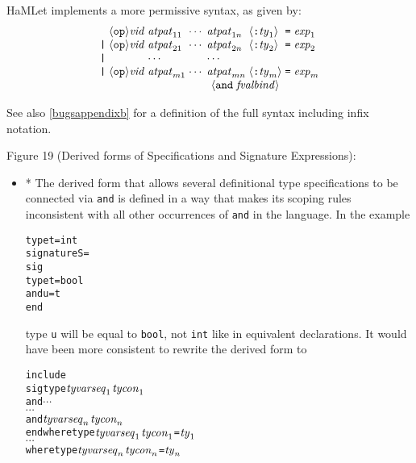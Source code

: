 \documentclass[twoside,titlepage]{article}
\begin{document}
\begin{appendix}
\begin{itemize}
HaMLet implements a more permissive syntax, as given by:
%
\begin{displaymath}
\begin{array}{l@{\;}l@{\;}l@{\;}l@{\;}l@{\;}l@{\;}l@{\;}l}
& \langle{\tt{op}}\rangle\mathit{vid} & \mathit{atpat}_{11} & \cdots & \mathit{atpat}_{1n} & \langle\mbox{\tt:}\mathit{ty}_1\rangle &\mbox{\tt=}& \mathit{exp}_1 \\
\mbox{\tt|} & \langle{\tt{op}}\rangle\mathit{vid} & \mathit{atpat}_{21} & \cdots & \mathit{atpat}_{2n} & \langle\mbox{\tt:}\mathit{ty}_2\rangle &\mbox{\tt=}& \mathit{exp}_2 \\
\mbox{\tt|} & & \cdots & & \cdots \\
\mbox{\tt|} & \langle{\tt{op}}\rangle\mathit{vid} & \mathit{atpat}_{m1} & \cdots & \mathit{atpat}_{mn} & \langle\mbox{\tt:}\mathit{ty}_m\rangle &\mbox{\tt=}& \mathit{exp}_m \\
\multicolumn{6}{r}{\langle {\tt and} \; \mathit{fvalbind} \rangle}
\end{array}
\end{displaymath}

See also \ref{bugsappendixb} for a definition of the full syntax including infix notation.
\end{itemize}


Figure 19 (Derived forms of Specifications and Signature Expressions):

\begin{itemize}
\item * The derived form that allows several definitional type specifications to be connected via {\tt and} is defined in a way that makes its scoping rules inconsistent with all other occurrences of {\tt and} in the language. In the example

\begin{quoting}
\begin{alltt}
type t = int
signature S =
sig
  type t = bool
  and  u = t
end
\end{alltt}
\end{quoting}

type {\tt u} will be equal to {\tt bool}, not {\tt int} like in equivalent declarations. It would have been more consistent to rewrite the derived form to

\begin{quoting}
\begin{alltt}
include
  sig type \(\mathit{tyvarseq}\sb{1}\) \(\mathit{tycon}\sb{1}\)
       and \(\cdots\)
       \(\cdots\)
       and \(\mathit{tyvarseq}\sb{n}\) \(\mathit{tycon}\sb{n}\)
  end where type \(\mathit{tyvarseq}\sb{1}\) \(\mathit{tycon}\sb{1}\) = \(\mathit{ty}\sb{1}\)
      \(\cdots\)
      where type \(\mathit{tyvarseq}\sb{n}\) \(\mathit{tycon}\sb{n}\) = \(\mathit{ty}\sb{n}\)
\end{alltt}
\end{quoting}


\end{itemize}
\end{appendix}
\end{document}
